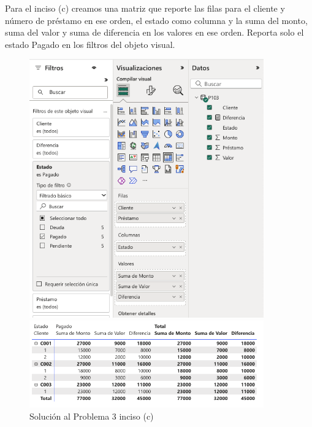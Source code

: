 \documentclass{article}
\begin{document}
\break
\noindent
Para el inciso (c) creamos una matriz que reporte las filas para el cliente y número de préstamo en ese orden, el estado como columna y la suma del monto, suma del valor y suma de diferencia en los valores en ese orden. Reporta solo el estado Pagado en los filtros del objeto visual.
\begin{figure}[!ht]
    \centering
    \begin{minipage}{\textwidth}
        \centering
        \includegraphics[width=0.9\textwidth]{figures/s103c-1.png}
    \end{minipage}
    \hfill
    \begin{minipage}{\textwidth}
        \centering
        \includegraphics[width=0.9\textwidth]{figures/s103c-2.png}
    \end{minipage}
    \captionsetup{width=0.9\textwidth}
    \caption{Solución al Problema 3 inciso (c)}
    \label{fig:s103c}
\end{figure}
\end{document}
